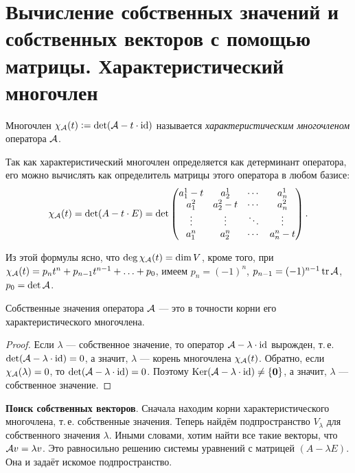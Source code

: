 \section{Вычисление собственных значений и собственных векторов с помощью матрицы. Характеристический многочлен}

\begin{definition}
    Многочлен $\chi_{\mathcal{A}}(t) \vcentcolon = \det(\mathcal{A} - t \cdot \mathrm{id})$ называется \textit{характеристическим многочленом} оператора $\mathcal{A}$.
\end{definition}

Так как характеристический многочлен определяется как детерминант оператора, его можно вычислять как определитель матрицы этого оператора в любом базисе:
\[
    \chi_{\mathcal{A}}(t) = \det(A - t \cdot E) = \det
    \begin{pmatrix}
        a^1_1 - t & a^1_2 & \cdots & a^1_n\\
        a^2_1 & a^2_2 - t & \cdots & a^2_n\\
        \vdots & \vdots & \ddots & \vdots\\
        a^n_1 & a^n_2 & \cdots & a^n_n - t\\
    \end{pmatrix}.
\]

Из этой формулы ясно, что $\deg\chi_{\mathcal{A}}(t) = \dim V$, кроме того, при $\chi_{\mathcal{A}}(t) = p_nt^n + p_{n - 1}t^{n - 1} + \ldots + p_0$, имеем $p_n = (-1)^n$, $p_{n - 1} = (-1)^{n - 1}\operatorname{tr}\mathcal{A}$, $p_0 = \det\mathcal{A}$.

\begin{proposal}
    Собственные значения оператора $\mathcal{A}$ --- это в точности корни его характеристического многочлена.
\end{proposal}

\begin{proof}
    Если $\lambda$ --- собственное значение, то оператор $\mathcal{A} - \lambda \cdot \mathrm{id}$ вырожден, т.\,е. $\det(\mathcal{A} - \lambda \cdot \mathrm{id}) = 0$, а значит, $\lambda$ --- корень многочлена $\chi_{\mathcal{A}}(t)$. Обратно, если $\chi_{\mathcal{A}}(\lambda) = 0$, то $\det(\mathcal{A} - \lambda \cdot \mathrm{id}) = 0$. Поэтому $\operatorname{Ker}(\mathcal{A} - \lambda \cdot \mathrm{id}) \ne \{\boldsymbol{0}\}$, а значит, $\lambda$ --- собственное значение.
\end{proof}

\textbf{Поиск собственных векторов}. Сначала находим корни характеристического многочлена, т.\,е. собственные значения. Теперь найдём подпространство $V_\lambda$ для собственного значения $\lambda$. Иными словами, хотим найти все такие векторы, что $\mathcal{A} v = \lambda v$. Это равносильно решению системы уравнений с матрицей $(A - \lambda E)$. Она и задаёт искомое подпространство.
